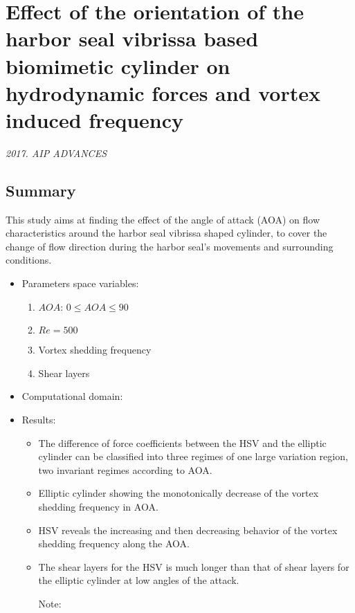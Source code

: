 \documentclass[preprint, letterpaper, nobibnotes, aps, superscriptaddress,prb]{revtex4-1}
\begin{document}
\section{Effect of the orientation of the harbor seal vibrissa based biomimetic cylinder on hydrodynamic forces and vortex induced frequency}

\textit{2017. AIP ADVANCES}

\subsection{Summary}
This study aims at finding the effect of the angle of attack (AOA) on flow characteristics around the harbor seal vibrissa shaped cylinder, to cover the change of flow direction during the harbor seal’s movements and surrounding conditions.
\begin{itemize}
\item
Parameters space variables: 
\begin{enumerate}
\item 
$AOA$: $0\leq AOA \leq 90$
\item 
$Re = 500$
\item 
Vortex shedding frequency
\item 
Shear layers
\end{enumerate}
\item
Computational domain: 
\begin{figure}[H]
  \centering {}
  \caption{}\label{fig1}
\end{figure}
\item
Results: 
\begin{itemize}
	\item
	The difference of force coefficients between the HSV and the elliptic cylinder can be classified into three regimes of one large variation region, two invariant regimes according to AOA.

	\item Elliptic cylinder showing the monotonically decrease of the vortex shedding frequency in AOA.

	\item HSV reveals the increasing and then decreasing behavior of the vortex shedding frequency along the AOA.

	\item The shear layers for the HSV is much longer than that of shear layers for the elliptic cylinder at low angles of the attack.

Note:

\end{itemize}
\end{itemize}
\end{document}
